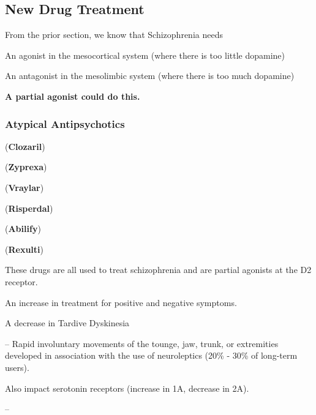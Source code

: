 \subsection{New Drug Treatment}

\begin{coloredlist}
    \item From the prior section, we know that Schizophrenia needs
    \begin{coloredlist}
        \item An agonist in the mesocortical system (where there is too little dopamine)
        \item An antagonist in the mesolimbic system (where there is too much dopamine)
        \item \textbf{A partial agonist could do this.}
    \end{coloredlist}
\end{coloredlist}

\subsubsection{Atypical Antipsychotics}

\begin{coloredlist}
\begin{multicols}{2}
    \item {} (\textbf{Clozaril})
    \item {} (\textbf{Zyprexa})
    \item {} (\textbf{Vraylar})
    \item {} (\textbf{Risperdal})
    \item {} (\textbf{Abilify})
    \item {} (\textbf{Rexulti})
\end{multicols}
    \item These drugs are all used to treat schizophrenia and are partial agonists at the D2 receptor.
    \item An increase in treatment for positive and negative symptoms.
    \item A decrease in Tardive Dyskinesia
    \item {} -- Rapid involuntary movements of the tounge, jaw, trunk, or extremities developed in association with the use of neuroleptics (20\% - 30\% of long-term users).
    \item Also impact serotonin receptors (increase in 1A, decrease in 2A).
    \begin{coloredlist}
        \item {} -- 
    \end{coloredlist}
\end{coloredlist}
